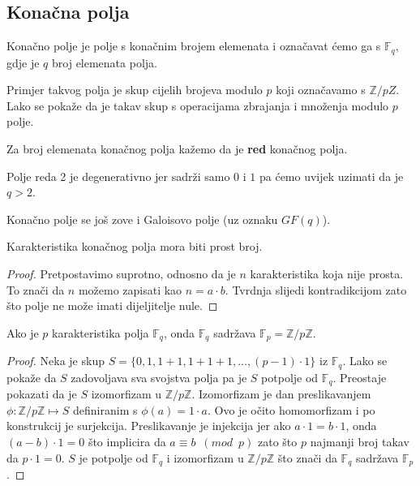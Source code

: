 \documentclass{mathos}
\begin{document}
\subsection{Konačna polja}
\begin{defin}
    Konačno polje je polje s konačnim brojem elemenata i označavat ćemo ga s $\mathbb{F}_q$, gdje je $q$ broj elemenata polja.
\end{defin}
\begin{primjer}
    Primjer takvog polja je skup cijelih brojeva modulo $p$ koji označavamo s $\mathbb{Z}/pZ$. Lako se pokaže da je takav skup s operacijama zbrajanja i množenja modulo $p$ polje.
\end{primjer}
\begin{defin}
    Za broj elemenata konačnog polja kažemo da je \textbf{red} konačnog polja.
\end{defin}
Polje reda 2 je degenerativno jer sadrži samo $0$ i $1$ pa ćemo uvijek uzimati da je $q > 2$.
\begin{nap}
    Konačno polje se još zove i Galoisovo polje (uz oznaku $GF(q)$).
\end{nap}
\begin{propozicija}
    Karakteristika konačnog polja mora biti prost broj.
\end{propozicija}
\begin{proof}
    Pretpostavimo suprotno, odnosno da je $n$ karakteristika koja nije prosta. To znači da $n$ možemo zapisati kao $n = a\cdot b$. Tvrdnja slijedi kontradikcijom zato što polje ne može imati dijeljitelje nule.
\end{proof}
\begin{lema}
    Ako je $p$ karakteristika polja $\mathbb{F}_q$, onda $\mathbb{F}_q$ sadržava $\mathbb{F}_p = \mathbb{Z}/p\mathbb{Z}$.
\end{lema}
\begin{proof}
    Neka je skup $S = \{0, 1, 1+1, 1+1+1, ..., (p-1) \cdot 1\}$ iz $\mathbb{F}_q$. Lako se pokaže da $S$ zadovoljava sva svojstva polja pa je $S$ potpolje od $\mathbb{F}_q$. Preostaje pokazati da je $S$ izomorfizam u $\mathbb{Z}/p\mathbb{Z}$. Izomorfizam je dan preslikavanjem $\phi: \mathbb{Z}/p\mathbb{Z} \mapsto S$ definiranim s $\phi(a) = 1 \cdot a$. Ovo je očito homomorfizam i po konstrukcij je surjekcija. Preslikavanje je injekcija jer ako $a \cdot 1 = b \cdot 1$, onda $(a - b) \cdot 1 = 0$ što implicira da $a \equiv b \enspace (mod \enspace p)$ zato što $p$ najmanji broj takav da $p \cdot 1 = 0$. $S$ je potpolje od $\mathbb{F}_q$ i izomorfizam u $\mathbb{Z}/p\mathbb{Z}$ što znači da $\mathbb{F}_q$ sadržava $\mathbb{F}_p$.
\end{proof}
\end{document}
